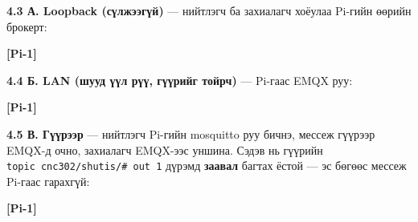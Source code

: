 \textbf{4.3 А. Loopback (сүлжээгүй)} --- нийтлэгч ба захиалагч хоёулаа Pi-гийн өөрийн брокерт:

\textbf{{[}Pi-1{]}}

\begin{Shaded}
\begin{Highlighting}[]
 \KeywordTok{\textbackslash{}}
    \KeywordTok{\textbackslash{}}
\end{Highlighting}
\end{Shaded}

\textbf{4.4 Б. LAN (шууд үүл рүү, гүүрийг тойрч)} --- Pi-гаас EMQX руу:

\textbf{{[}Pi-1{]}}

\begin{Shaded}
\begin{Highlighting}[]
 \KeywordTok{\textbackslash{}}
    \KeywordTok{\textbackslash{}}
\end{Highlighting}
\end{Shaded}

\textbf{4.5 В. Гүүрээр} --- нийтлэгч Pi-гийн mosquitto руу бичнэ, мессеж гүүрээр EMQX-д очно, захиалагч EMQX-ээс уншина. Сэдэв нь гүүрийн \texttt{topic\ cnc302/\allowbreak{}shutis/\allowbreak{}\#\ out\ 1} дүрэмд \textbf{заавал} багтах ёстой --- эс бөгөөс мессеж Pi-гаас гарахгүй:

\textbf{{[}Pi-1{]}}

\begin{Shaded}
\begin{Highlighting}[]
 \KeywordTok{\textbackslash{}}
     \KeywordTok{\textbackslash{}}
    \KeywordTok{\textbackslash{}}
    \KeywordTok{\textbackslash{}}
\end{Highlighting}
\end{Shaded}


